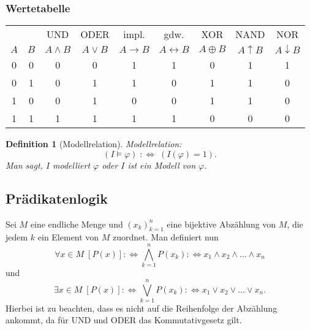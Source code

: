 \documentclass[a4paper,11pt,fleqn,twoside]{scrartcl}
\numberwithin{equation}{section}
\newcommand{\defiff}{\;:\Longleftrightarrow\;}
\theoremstyle{rmbox}
\newtheorem{Definition}{Definition}
\newcommand{\emdef}[1]{\emph{#1}}
\newcommand{\pstrut}[1]{\rule{0pt}{\dimexpr 8pt+#1}}
\begin{document}
\subsubsection*{Wertetabelle}
\begin{tabular}{c|c|c|c|c|c|c|c|c}
& & UND & ODER & impl. & gdw. & XOR & NAND & NOR\\
$A$ & $B$ & $A\land B$ & $A\lor B$
& $A\rightarrow B$ & $A\leftrightarrow B$
& $A\oplus B$ & $A\uparrow B$ & $A\downarrow B$\\
\hline\pstrut{4pt}%
0 & 0 & 0 & 0 & 1 & 1 & 0 & 1 & 1\\
0 & 1 & 0 & 1 & 1 & 0 & 1 & 1 & 0\\
1 & 0 & 0 & 1 & 0 & 0 & 1 & 1 & 0\\
1 & 1 & 1 & 1 & 1 & 1 & 0 & 0 & 0
\end{tabular}

\vspace{10pt}
\begin{Definition}[Modellrelation]
\emdef{Modellrelation}:
\begin{equation}
(I\models\varphi) \defiff (I(\varphi)=1).
\end{equation}
Man sagt, $I$ \emdef{modelliert} $\varphi$ oder
$I$ \emdef{ist ein Modell von} $\varphi$.
\end{Definition}

\subsection{Prädikatenlogik}
Sei $M$ eine endliche Menge und $(x_k)_{k=1}^n$ eine bijektive
Abzählung von $M$, die jedem $k$ ein Element von $M$ zuordnet.
Man definiert nun
\begin{equation}
\forall x{\in}M\;[P(x)] :\Longleftrightarrow \bigwedge_{k=1}^n P(x_k) :\Longleftrightarrow x_1\land x_2\land\ldots\land x_n
\end{equation}
und
\begin{equation}
\exists x{\in}M\;[P(x)] :\Longleftrightarrow \bigvee_{k=1}^n P(x_k) :\Longleftrightarrow x_1\lor x_2\lor\ldots\lor x_n.
\end{equation}
Hierbei ist zu beachten, dass es nicht auf die Reihenfolge der
Abzählung ankommt, da für UND und ODER das Kommutativgesetz gilt.
\end{document}
